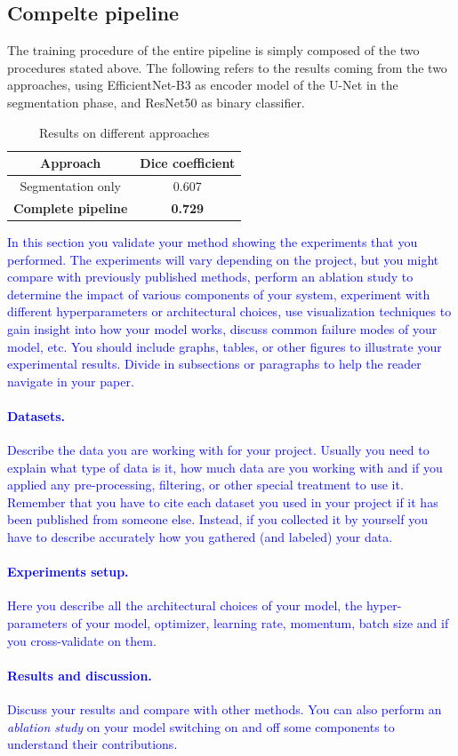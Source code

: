 \documentclass[10pt,twocolumn,letterpaper]{article}
\begin{document}
   \subsection{Compelte pipeline}
      The training procedure of the entire pipeline is simply composed of the two procedures stated above.
      The following refers to the results coming from the two approaches, using EfficientNet-B3 as encoder model of the U-Net in the segmentation phase, and ResNet50 as binary classifier. 
      \begin{table}[h]
         \centering
         \begin{tabular}{||c c||} 
         \hline
         Approach & Dice coefficient\\ [0.5ex] 
         \hline\hline
         Segmentation only & 0.607 \\ 
         \hline
         \textbf{Complete pipeline} & \textbf{0.729} \\
         \hline
         \end{tabular}
         \caption{Results on different approaches}
         \label{table:res_finals}
      \end{table}


\textcolor{blue}{
In this section you validate your method showing the experiments that you performed. The experiments will vary depending on the project, but you might compare with previously published methods, perform an ablation study to determine the impact of various components of your system, experiment with different hyperparameters or architectural choices, use visualization techniques to gain insight into how your model works, discuss common failure modes of your model, etc. You should include graphs, tables, or other figures to illustrate your experimental results. Divide in subsections or paragraphs to help the reader navigate in your paper.
\paragraph{Datasets.}
Describe the data you are working with for your project. Usually you need to explain what type of data is it, how much data are you working with and if you applied any pre-processing, filtering, or other special treatment to use it. Remember that you have to cite each dataset you used in your project if it has been published from someone else. Instead, if you collected it by yourself you have to describe accurately how you gathered (and labeled) your data. 
\paragraph{Experiments setup.}
Here you describe all the architectural choices of your model, the hyper-parameters of your model, \eg optimizer, learning rate, momentum, batch size and if you cross-validate on them. 
\paragraph{Results and discussion.}
Discuss your results and compare with other methods. You can also perform an \emph{ablation study} on your model switching on and off some components to understand their contributions.
}
\end{document}
